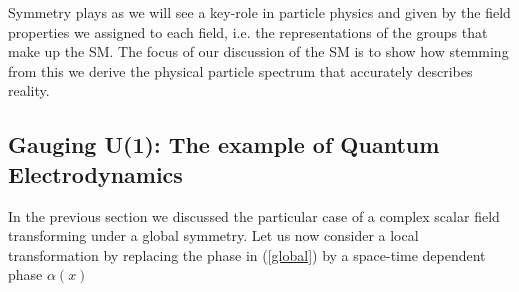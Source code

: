 

Symmetry plays as we will see a key-role in particle physics and given by the field properties we assigned to each field, i.e. the representations of the groups that make up the SM. 
%
The focus of our discussion of the SM is to show how stemming from this we derive the physical particle spectrum that accurately describes reality. 



\subsection{Gauging U(1): The example of Quantum Electrodynamics}

In the previous section we discussed the particular case of a complex scalar field transforming under a global symmetry.
%
%
%
%
%
Let us now consider a local transformation by replacing the phase in (\ref{global}) by a space-time dependent phase $\alpha (x)$

